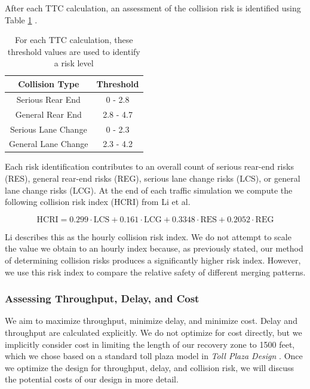 \documentclass[a4paper, 11pt]{article}
\begin{document}
After each TTC calculation, an assessment of the collision risk is identified using Table \ref{fig:ColRisk} \cite{crashRisk}. 
 
\begin{center}
\begin{table}[h!]
\centering
\begin{tabular}{|c|c|}
\hline
Collision Type & Threshold \\
\hline
Serious Rear End & 0 - 2.8 \\
\hline
General Rear End & 2.8 - 4.7 \\
\hline
Serious Lane Change & 0 - 2.3 \\
\hline
General Lane Change & 2.3 - 4.2 \\
\hline
\end{tabular}

\caption{For each TTC calculation, these threshold values are used to identify a risk level \cite{crashRisk}}
\label{fig:ColRisk}
\end{table}
\end{center}

Each risk identification contributes to an overall count of serious rear-end risks (RES), general rear-end risks (REG), serious lane change risks (LCS), or general lane change risks (LCG). At the end of each traffic simulation we compute the following collision risk index (HCRI) from Li et al. 

\begin{equation}
\mbox{HCRI} = 0.299 \cdot \mbox{LCS} + 0.161 \cdot \mbox{LCG} + 0.3348 \cdot \mbox{RES} + 0.2052 \cdot \mbox{REG}
\end{equation}

Li describes this as the hourly collision risk index. We do not attempt to scale the value we obtain to an hourly index because, as previously stated, our method of determining collision risks produces a significantly higher risk index. However, we use this risk index to compare the relative safety of different merging patterns. 

\subsubsection{Assessing Throughput, Delay, and Cost}
\label{cost_delay}
We aim to maximize throughput, minimize delay, and minimize cost. Delay and throughput are calculated explicitly. We do not optimize for cost directly, but we implicitly consider cost in limiting the length of our recovery zone to 1500 feet, which we chose based on a standard toll plaza model in \textit{Toll Plaza Design} \cite{tollDesignBook}. Once we optimize the design for throughput, delay, and collision risk, we will discuss the potential costs of our design in more detail. 
\end{document}
